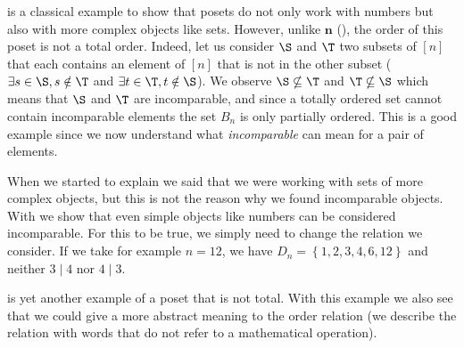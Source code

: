  is a classical example to show that posets do not only
work with numbers but also with more complex objects like sets. However, unlike
$\bm{n}$ (), the order of this poset is not a total order.
Indeed, let us consider $\S$ and $\T$ two subsets of $[n]$ that each contains an
element of $[n]$ that is not in the other subset ($\exists s \in \S, s \notin
\T$ and $\exists t \in \T, t \notin \S$). We observe $\S \nsubseteq \T$ and $\T
\nsubseteq \S$ which means that $\S$ and $\T$ are incomparable, and since a
totally ordered set cannot contain incomparable elements the set $B_n$ is only
partially ordered. This is a good example since we now understand what
\emph{incomparable} can mean for a pair of elements.


When we started to explain  we said that we were working
with sets of more complex objects, but this is not the reason why we found
incomparable objects. With  we show that even simple
objects like numbers can be considered incomparable. For this to be true, we
simply need to change the relation we consider. If we take for example $n =
12$, we have $D_n = \left\{{1, 2, 3, 4, 6, 12}\right\}$ and neither $3 \mid 4$
nor $4 \mid 3$.


 is yet another example of a poset that is not total. With
this example we also see that we could give a more abstract meaning to the
order relation (we describe the relation with words that do not refer to a
mathematical operation).
